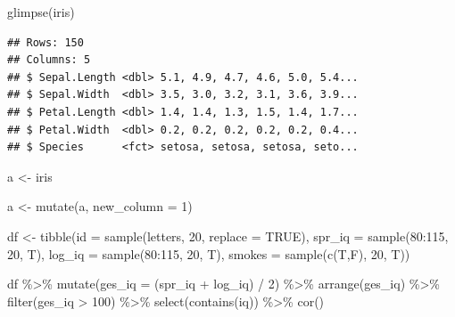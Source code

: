 \documentclass[
]{book}
\newenvironment{Shaded}{\begin{snugshade}}{\end{snugshade}}
\newcommand{\AttributeTok}[1]{\textcolor[rgb]{0.77,0.63,0.00}{#1}}
\newcommand{\ConstantTok}[1]{\textcolor[rgb]{0.00,0.00,0.00}{#1}}
\newcommand{\DecValTok}[1]{\textcolor[rgb]{0.00,0.00,0.81}{#1}}
\newcommand{\FunctionTok}[1]{\textcolor[rgb]{0.00,0.00,0.00}{#1}}
\newcommand{\NormalTok}[1]{#1}
\newcommand{\OtherTok}[1]{\textcolor[rgb]{0.56,0.35,0.01}{#1}}
\newcommand{\SpecialCharTok}[1]{\textcolor[rgb]{0.00,0.00,0.00}{#1}}
\newcommand{\StringTok}[1]{\textcolor[rgb]{0.31,0.60,0.02}{#1}}
\begin{document}
\begin{Shaded}
\begin{Highlighting}[]
\FunctionTok{glimpse}\NormalTok{(iris)}
\end{Highlighting}
\end{Shaded}

\begin{verbatim}
## Rows: 150
## Columns: 5
## $ Sepal.Length <dbl> 5.1, 4.9, 4.7, 4.6, 5.0, 5.4...
## $ Sepal.Width  <dbl> 3.5, 3.0, 3.2, 3.1, 3.6, 3.9...
## $ Petal.Length <dbl> 1.4, 1.4, 1.3, 1.5, 1.4, 1.7...
## $ Petal.Width  <dbl> 0.2, 0.2, 0.2, 0.2, 0.2, 0.4...
## $ Species      <fct> setosa, setosa, setosa, seto...
\end{verbatim}

\begin{Shaded}
\begin{Highlighting}[]
\NormalTok{a }\OtherTok{\textless{}{-}}\NormalTok{ iris}

\NormalTok{a }\OtherTok{\textless{}{-}} \FunctionTok{mutate}\NormalTok{(a, }\AttributeTok{new\_column =} \DecValTok{1}\NormalTok{)}


\NormalTok{df }\OtherTok{\textless{}{-}} \FunctionTok{tibble}\NormalTok{(}\AttributeTok{id =} \FunctionTok{sample}\NormalTok{(letters, }\DecValTok{20}\NormalTok{, }\AttributeTok{replace =} \ConstantTok{TRUE}\NormalTok{),}
             \AttributeTok{spr\_iq =} \FunctionTok{sample}\NormalTok{(}\DecValTok{80}\SpecialCharTok{:}\DecValTok{115}\NormalTok{, }\DecValTok{20}\NormalTok{, T),}
             \AttributeTok{log\_iq =} \FunctionTok{sample}\NormalTok{(}\DecValTok{80}\SpecialCharTok{:}\DecValTok{115}\NormalTok{, }\DecValTok{20}\NormalTok{, T),}
             \AttributeTok{smokes =} \FunctionTok{sample}\NormalTok{(}\FunctionTok{c}\NormalTok{(T,F), }\DecValTok{20}\NormalTok{, T))}

\NormalTok{df }\SpecialCharTok{\%\textgreater{}\%} 
  \FunctionTok{mutate}\NormalTok{(}\AttributeTok{ges\_iq =}\NormalTok{ (spr\_iq }\SpecialCharTok{+}\NormalTok{ log\_iq) }\SpecialCharTok{/} \DecValTok{2}\NormalTok{) }\SpecialCharTok{\%\textgreater{}\%} 
  \FunctionTok{arrange}\NormalTok{(ges\_iq) }\SpecialCharTok{\%\textgreater{}\%} 
  \FunctionTok{filter}\NormalTok{(ges\_iq }\SpecialCharTok{\textgreater{}} \DecValTok{100}\NormalTok{) }\SpecialCharTok{\%\textgreater{}\%} 
  \FunctionTok{select}\NormalTok{(}\FunctionTok{contains}\NormalTok{(}\StringTok{\textquotesingle{}iq\textquotesingle{}}\NormalTok{)) }\SpecialCharTok{\%\textgreater{}\%} 
  \FunctionTok{cor}\NormalTok{()}
\end{Highlighting}
\end{Shaded}
\end{document}
